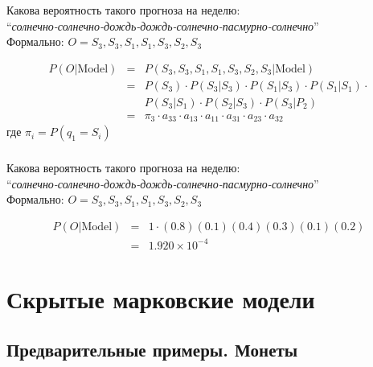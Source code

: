 \documentclass{beamer}
\begin{document}
\begin{frame} \label{example_begin}
  \frametitle{\insertsection}
  \framesubtitle{\insertsubsection}
  Какова вероятность такого прогноза на неделю: \\
  ``\textit{\small{солнечно-солнечно-дождь-дождь-солнечно-пасмурно-солнечно}}''\\
  Формально: $O = S_3, S_3, S_1, S_1, S_3, S_2, S_3$ \pause

  \begin{eqnarray*}
    P(O | \text{Model}) & = & P(S_3, S_3, S_1, S_1, S_3, S_2, S_3 | \text{Model})\\
    & = & P(S_3) \cdot P(S_3|S_3) \cdot P(S_1|S_3) \cdot P(S_1|S_1) \cdot \\
    && P(S_3|S_1) \cdot P(S_2|S_3) \cdot P(S_3|P_2) \\
    & = & \pi_3 \cdot a_{33} \cdot a_{13} \cdot a_{11} \cdot a_{31}\cdot a_{23} \cdot a_{32}
  \end{eqnarray*}
  где $\pi_i = P(q_1 = S_i)$
\end{frame}

\begin{frame} \label{example_begin}
  \frametitle{\insertsection}
  \framesubtitle{\insertsubsection}
  Какова вероятность такого прогноза на неделю: \\
  ``\textit{\small{солнечно-солнечно-дождь-дождь-солнечно-пасмурно-солнечно}}''\\
  Формально: $O = S_3, S_3, S_1, S_1, S_3, S_2, S_3$

  \begin{eqnarray*}
    P(O | \text{Model}) & = & 1 \cdot (0.8)(0.1)(0.4)(0.3)(0.1)(0.2) \\
    & = & 1.920 \times 10^{-4}
  \end{eqnarray*}
\end{frame}


\section{Скрытые марковские модели}

\subsection{Предварительные примеры. Монеты}
\end{document}
